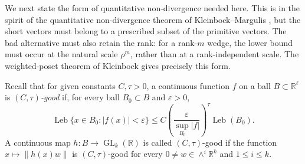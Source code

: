 \documentclass[reqno,11pt]{amsart}
\numberwithin{equation}{section}
\theoremstyle{definition}
\theoremstyle{remark}
\newcommand{\op}{\operatorname}
\newcommand{\GL}{\op{GL}}
\begin{document}
We next state the form of quantitative non-divergence needed here. This is
in the spirit of the quantitative non-divergence theorem of
Kleinbock--Margulis \cite{kleinbock-margulis:1998}, but the short vectors
must belong to a prescribed subset of the primitive vectors. The bad
alternative must also retain the rank: for a rank-$m$ wedge, the lower bound
must occur at the natural scale $\rho^m$, rather than at a rank-independent
scale. The weighted-poset theorem of Kleinbock
\cite[Theorem~2.1]{kleinbock:2008} gives precisely this form.


Recall that for given constants $C, \tau>0$, a continuous function $f$ on a ball $B\subset\mathbb R^\ell$
is \emph{$(C,\tau)$-good} if, for every ball $B_0\subset B$ and 
$\varepsilon>0$,
$$
\operatorname{Leb}\{x\in B_0:|f(x)|<\varepsilon\}
\le
C\left(\frac{\varepsilon}{\sup_{B_0}|f|}\right)^\tau
\operatorname{Leb}(B_0).
$$
A continuous map $h:B\to\GL_k(\mathbb R)$ is called $(C,\tau)$-good if the function
$x\mapsto\|h(x)w\|$ is $(C,\tau)$-good for every
$0\ne w\in\wedge^i\mathbb R^k$ and $1\le i\le k$.
\end{document}

